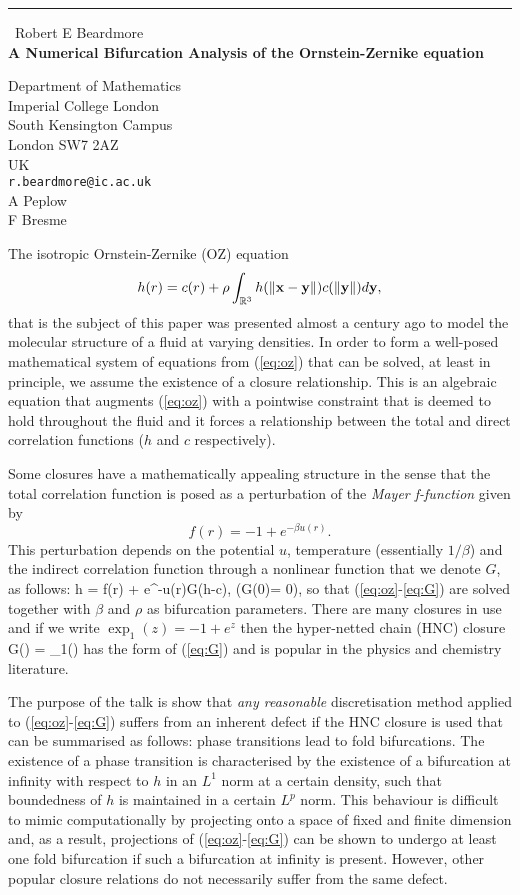 \documentclass{report}
\begin{document}
\begin{center}
\rule{6in}{1pt} \
{\large Robert E Beardmore \\
{\bf A Numerical Bifurcation Analysis of the Ornstein-Zernike equation}}

Department of Mathematics \\ Imperial College London \\ South Kensington Campus \\ London SW7 2AZ \\ UK
\\
{\tt r.beardmore@ic.ac.uk}\\
A Peplow\\
F Bresme\end{center}

The isotropic Ornstein-Zernike (OZ) equation
\begin{equation}
\label{eq:oz} h(r) = c(r) + \rho \int_{\mathbb{R}^{3}} h(\|{\bf x}-{\bf
y}\|)c(\|{\bf y}\|)d{\bf y},
\end{equation}
that is the subject of this paper was presented almost a century ago to
model the molecular
structure of a fluid at varying densities.
In order to form a well-posed mathematical system of equations from
(\ref{eq:oz}) that can be solved, at least in principle, we assume
the existence of a closure relationship. This is an algebraic
equation that augments (\ref{eq:oz}) with a pointwise constraint
that is deemed to hold throughout the fluid and it forces a
relationship between the total and direct correlation functions ($h$ and
$c$ respectively).

Some closures have a mathematically appealing structure in the sense that the
total correlation function is posed as a perturbation of the {\em
Mayer f-function} given by
\[ f(r)=-1+e^{-\beta u(r)}.\]
This perturbation depends on the potential $u$, temperature (essentially
$1/\beta$) and the
indirect correlation function through a nonlinear function that we
denote $G$, as follows: \be h = f(r) + e^{-\beta u(r)}G(h-c),\qquad
(G(0)= 0), \label{eq:G} \ee so that
(\ref{eq:oz}-\ref{eq:G}) are solved together with $\beta$ and $\rho$
as bifurcation parameters.
There are many closures in use and if we
write $\exp_1(z) = -1+e^z$ then the hyper-netted chain (HNC) closure \be G(\gamma)
= \exp_1(\gamma) \ee has the form of
(\ref{eq:G}) and is popular in the physics and chemistry literature.

The purpose of the talk is show that {\em any reasonable} discretisation
method applied to (\ref{eq:oz}-\ref{eq:G}) suffers from an inherent
defect if the HNC closure is used that can be summarised as follows:
phase transitions lead to fold bifurcations. The existence of a phase
transition is characterised by the existence of a bifurcation at infinity
with respect to $h$ in an $L^1$ norm at a certain density, such that
boundedness of $h$ is maintained in a certain $L^p$ norm. This behaviour
is difficult to mimic computationally by projecting onto a space of fixed
and finite dimension and, as a result, projections of
(\ref{eq:oz}-\ref{eq:G}) can be shown to undergo at least one fold
bifurcation if such a bifurcation at infinity is present. However, other
popular closure relations do not necessarily suffer from the same defect.
\end{document}
